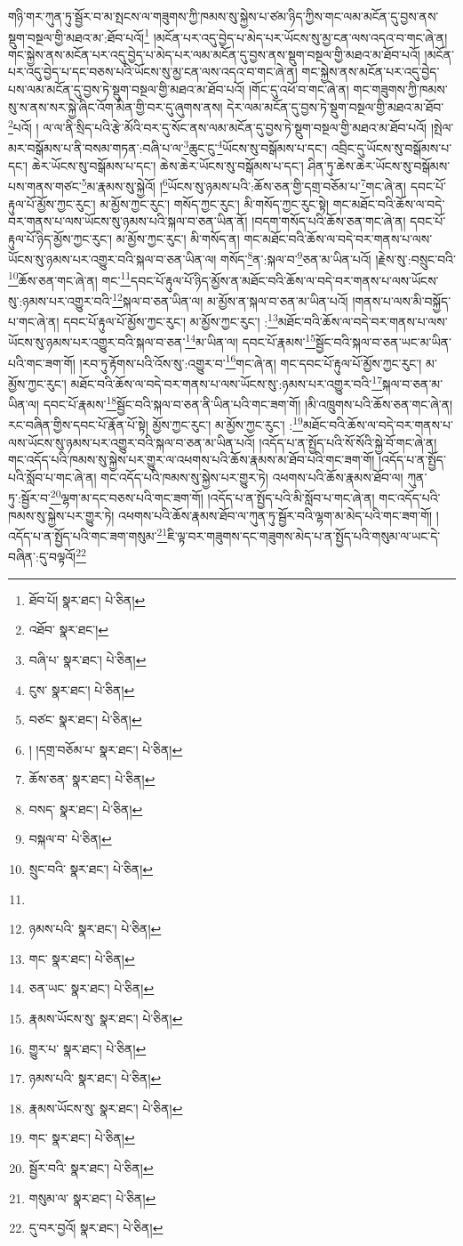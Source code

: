 གཉི་གར་ཀུན་ཏུ་སྦྱོར་བ་མ་སྤངས་ལ་གཟུགས་ཀྱི་ཁམས་སུ་སྐྱེས་པ་ཙམ་ཉིད་ཀྱིས་གང་ལམ་མངོན་དུ་བྱས་ནས་སྡུག་བསྔལ་གྱི་མཐའ་མ་:ཐོབ་པའོ།\footnote{ཐོབ་པོ།  སྣར་ཐང་།  པེ་ཅིན། } །མངོན་པར་འདུ་བྱེད་པ་མེད་པར་ཡོངས་སུ་མྱ་ངན་ལས་འདའ་བ་གང་ཞེ་ན། གང་སྐྱེས་ནས་མངོན་པར་འདུ་བྱེད་པ་མེད་པར་ལམ་མངོན་དུ་བྱས་ནས་སྡུག་བསྔལ་གྱི་མཐའ་མ་ཐོབ་པའོ། །མངོན་པར་འདུ་བྱེད་པ་དང་བཅས་པའི་ཡོངས་སུ་མྱ་ངན་ལས་འདའ་བ་གང་ཞེ་ན། གང་སྐྱེས་ནས་མངོན་པར་འདུ་བྱེད་པས་ལམ་མངོན་དུ་བྱས་ཏེ་སྡུག་བསྔལ་གྱི་མཐའ་མ་ཐོབ་པའོ། །གོང་དུ་འཕོ་བ་གང་ཞེ་ན། གང་གཟུགས་ཀྱི་ཁམས་སུ་ས་ནས་སར་སྐྱེ་ཞིང་འོག་མིན་གྱི་བར་དུ་ཞུགས་ནས། དེར་ལམ་མངོན་དུ་བྱས་ཏེ་སྡུག་བསྔལ་གྱི་མཐའ་མ་ཐོབ་\footnote{འཐོབ་  སྣར་ཐང་། }པའོ། །
ལ་ལ་ནི་སྲིད་པའི་རྩེ་མོའི་བར་དུ་སོང་ནས་ལམ་མངོན་དུ་བྱས་ཏེ་སྡུག་བསྔལ་གྱི་མཐའ་མ་ཐོབ་པའོ། །སྤེལ་མར་བསྒོམས་པ་ནི་བསམ་གཏན་:བཞི་པ་ལ་\footnote{བཞི་པ་  སྣར་ཐང་།  པེ་ཅིན། }ཆུང་ངུ་\footnote{ངུས་  སྣར་ཐང་།  པེ་ཅིན། }ཡོངས་སུ་བསྒོམས་པ་དང་། འབྲིང་དུ་ཡོངས་སུ་བསྒོམས་པ་དང་། ཆེར་ཡོངས་སུ་བསྒོམས་པ་དང་། ཆེས་ཆེར་ཡོངས་སུ་བསྒོམས་པ་དང་། ཤིན་ཏུ་ཆེས་ཆེར་ཡོངས་སུ་བསྒོམས་པས་གནས་གཙང་\footnote{བཙང་  སྣར་ཐང་།  པེ་ཅིན། }མ་རྣམས་སུ་སྐྱེའོ། །\footnote{། །དགྲ་བཅོམ་པ་  སྣར་ཐང་།  པེ་ཅིན། }ཡོངས་སུ་ཉམས་པའི་:ཆོས་ཅན་གྱི་དགྲ་བཅོམ་པ་\footnote{ཆོས་ཅན་  སྣར་ཐང་།  པེ་ཅིན། }གང་ཞེ་ན། དབང་པོ་རྟུལ་པོ་མྱོས་ཀྱང་རུང་། མ་མྱོས་ཀྱང་རུང་། གསོད་ཀྱང་རུང་། མི་གསོད་ཀྱང་རུང་སྟེ། གང་མཐོང་བའི་ཆོས་ལ་བདེ་བར་གནས་པ་ལས་ཡོངས་སུ་ཉམས་པའི་སྐལ་བ་ཅན་ཡིན་ནོ། །བདག་གསོད་པའི་ཆོས་ཅན་གང་ཞེ་ན། དབང་པོ་རྟུལ་པོ་ཉིད་མྱོས་ཀྱང་རུང་། མ་མྱོས་ཀྱང་རུང་། མི་གསོད་ན། གང་མཐོང་བའི་ཆོས་ལ་བདེ་བར་གནས་པ་ལས་ཡོངས་སུ་ཉམས་པར་འགྱུར་བའི་སྐལ་བ་ཅན་ཡིན་ལ། གསོད་\footnote{བསད་  སྣར་ཐང་།  པེ་ཅིན། }ན་:སྐལ་བ་\footnote{བསྐལ་བ་  པེ་ཅིན། }ཅན་མ་ཡིན་པའོ། །རྗེས་སུ་:བསྲུང་བའི་\footnote{སྲུང་བའི་  སྣར་ཐང་།  པེ་ཅིན། }ཆོས་ཅན་གང་ཞེ་ན། གང་\footnote{}དབང་པོ་རྟུལ་པོ་ཉིད་མྱོས་ན་མཐོང་བའི་ཆོས་ལ་བདེ་བར་གནས་པ་ལས་ཡོངས་སུ་:ཉམས་པར་འགྱུར་བའི་\footnote{ཉམས་པའི་  སྣར་ཐང་།  པེ་ཅིན། }སྐལ་བ་ཅན་ཡིན་ལ། མ་མྱོས་ན་སྐལ་བ་ཅན་མ་ཡིན་པའོ། །གནས་པ་ལས་མི་བསྐྱོད་པ་གང་ཞེ་ན། དབང་པོ་རྟུལ་པོ་མྱོས་ཀྱང་རུང་། མ་མྱོས་ཀྱང་རུང་། :\footnote{གང་  སྣར་ཐང་།  པེ་ཅིན། }མཐོང་བའི་ཆོས་ལ་བདེ་བར་གནས་པ་ལས་ཡོངས་སུ་ཉམས་པར་འགྱུར་བའི་སྐལ་བ་ཅན་\footnote{ཅན་ཡང་  སྣར་ཐང་།  པེ་ཅིན། }མ་ཡིན་ལ། དབང་པོ་རྣམས་\footnote{རྣམས་ཡོངས་སུ་  སྣར་ཐང་།  པེ་ཅིན། }སྦྱོང་བའི་སྐལ་བ་ཅན་ཡང་མ་ཡིན་པའི་གང་ཟག་གོ། །རབ་ཏུ་རྟོགས་པའི་འོས་སུ་:འགྱུར་བ་\footnote{གྱུར་པ་  སྣར་ཐང་།  པེ་ཅིན། }གང་ཞེ་ན། གང་དབང་པོ་རྟུལ་པོ་མྱོས་ཀྱང་རུང་། མ་མྱོས་ཀྱང་རུང་། མཐོང་བའི་ཆོས་ལ་བདེ་བར་གནས་པ་ལས་ཡོངས་སུ་:ཉམས་པར་འགྱུར་བའི་\footnote{ཉམས་པའི་  སྣར་ཐང་།  པེ་ཅིན། }སྐལ་བ་ཅན་མ་ཡིན་ལ། དབང་པོ་རྣམས་\footnote{རྣམས་ཡོངས་སུ་  སྣར་ཐང་།  པེ་ཅིན། }སྦྱོང་བའི་སྐལ་བ་ཅན་ནི་ཡིན་པའི་གང་ཟག་གོ། །མི་འཁྲུགས་པའི་ཆོས་ཅན་གང་ཞེ་ན། རང་བཞིན་གྱིས་དབང་པོ་རྣོན་པོ་སྟེ། མྱོས་ཀྱང་རུང་། མ་མྱོས་ཀྱང་རུང་། :\footnote{གང་  སྣར་ཐང་།  པེ་ཅིན། }མཐོང་བའི་ཆོས་ལ་བདེ་བར་གནས་པ་ལས་ཡོངས་སུ་ཉམས་པར་འགྱུར་བའི་སྐལ་བ་ཅན་མ་ཡིན་པའོ། །འདོད་པ་ན་སྤྱོད་པའི་སོ་སོའི་སྐྱེ་བོ་གང་ཞེ་ན། གང་འདོད་པའི་ཁམས་སུ་སྐྱེས་པར་གྱུར་ལ་འཕགས་པའི་ཆོས་རྣམས་མ་ཐོབ་པའི་གང་ཟག་གོ། །འདོད་པ་ན་སྤྱོད་པའི་སློབ་པ་གང་ཞེ་ན། གང་འདོད་པའི་ཁམས་སུ་སྐྱེས་པར་གྱུར་ཏེ། འཕགས་པའི་ཆོས་རྣམས་ཐོབ་ལ། ཀུན་ཏུ་:སྦྱོར་བ་\footnote{སྦྱོར་བའི་  སྣར་ཐང་།  པེ་ཅིན། }ལྷག་མ་དང་བཅས་པའི་གང་ཟག་གོ། །འདོད་པ་ན་སྤྱོད་པའི་མི་སློབ་པ་གང་ཞེ་ན། གང་འདོད་པའི་ཁམས་སུ་སྐྱེས་པར་གྱུར་ཏེ། འཕགས་པའི་ཆོས་རྣམས་ཐོབ་ལ་ཀུན་ཏུ་སྦྱོར་བའི་ལྷག་མ་མེད་པའི་གང་ཟག་གོ། །འདོད་པ་ན་སྤྱོད་པའི་གང་ཟག་གསུམ་\footnote{གསུམ་ལ་  སྣར་ཐང་།  པེ་ཅིན། }ཇི་ལྟ་བར་གཟུགས་དང་གཟུགས་མེད་པ་ན་སྤྱོད་པའི་གསུམ་ལ་ཡང་དེ་བཞིན་:དུ་བལྟའོ།\footnote{དུ་བར་བྱའོ།  སྣར་ཐང་།  པེ་ཅིན། } 